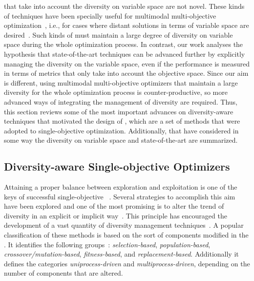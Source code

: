 \MOEAS{} that take into account the diversity on variable space are not novel.
%
These kinds of techniques have been specially useful for multimodal multi-objective optimization~\cite{Liang:16},
i.e., for cases where distant solutions in terms of variable space are desired~\cite{deb2008omni, cuate2019variation}.
%
Such kinds of \MOEAS{} must maintain a large degree of diversity on variable space during the whole optimization process.
%
In contrast, our work analyses the hypothesis that state-of-the-art techniques can be advanced further by explicitly managing
the diversity on the variable space, even if the performance is measured in terms of metrics that only take into account 
the objective space.
%
Since our aim is different, using multimodal multi-objective optimizers that maintain a large diversity 
for the whole optimization process is counter-productive, 
so more advanced ways of integrating the management of diversity are required.
%
Thus, this section reviews some of the most important advances on diversity-aware techniques that motivated the
design of \AVSDMOEAD{}, which are a set of methods that were adopted to single-objective optimization.
%
Additionally, \MOEAS{} that have considered in some way the diversity on variable space and
state-of-the-art \MOEAS{} are summarized.

\subsection{Diversity-aware Single-objective Optimizers}

Attaining a proper balance between exploration and exploitation is one of the keys of successful single-objective
\EAS{}~\cite{lin2009auto}.
%
Several strategies to accomplish this aim have been explored and one of the most promising is to alter the trend
of diversity in an explicit or implicit way~\cite{Joel:Crepinsek}.
%
This principle has encouraged the development of a vast quantity of diversity management techniques~\cite{pandey2014comparative}.
%
A popular classification of these methods is based on the sort of components modified in the \EA{}.
%
It identifies the following groups~\cite{Joel:Crepinsek}: \textit{selection-based}, \textit{population-based}, \textit{crossover/mutation-based}, \textit{fitness-based}, and \textit{replacement-based}.
%
Additionally it defines the categories \textit{uniprocess-driven} and \textit{multiprocess-driven}, depending on the number
of components that are altered.

